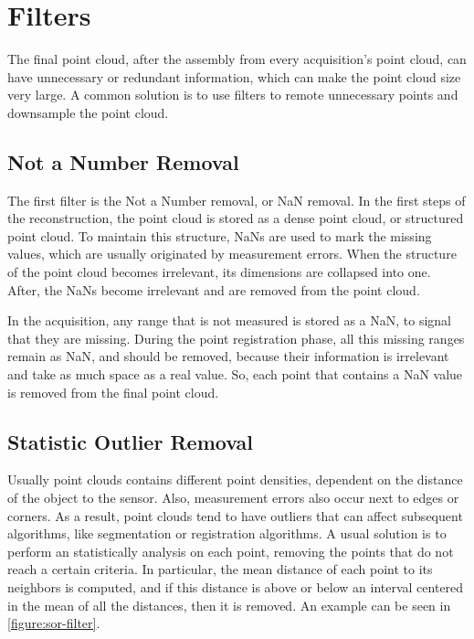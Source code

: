 \section{Filters}
\label{section:filters}

The final point cloud, after the assembly from every acquisition's point cloud, can have unnecessary or redundant information, which can make the point cloud size very large. A common solution is to use filters to remote unnecessary points and downsample the point cloud.

\subsection{Not a Number Removal}

The first filter is the Not a Number removal, or NaN removal. In the first steps of the reconstruction, the point cloud is stored as a dense point cloud, or structured point cloud. To maintain this structure, NaNs are used to mark the missing values, which are usually originated by measurement errors. When the structure of the point cloud becomes irrelevant, its dimensions are collapsed into one. After, the NaNs become irrelevant and are removed from the point cloud.

In the acquisition, any range that is not measured is stored as a NaN, to signal that they are missing. During the point registration phase, all this missing ranges remain as NaN, and should be removed, because their information is irrelevant and take as much space as a real value. So, each point that contains a NaN value is removed from the final point cloud.

\subsection{Statistic Outlier Removal}

Usually point clouds contains different point densities, dependent on the distance of the object to the sensor. Also, measurement errors also occur next to edges or corners. As a result, point clouds tend to have outliers that can affect subsequent algorithms, like segmentation or registration algorithms. A usual solution is to perform an statistically analysis on each point, removing the points that do not reach a certain criteria. In particular, the mean distance of each point to its neighbors is computed, and if this distance is above or below an interval centered in the mean of all the distances, then it is removed. An example can be seen in \cref{figure:sor-filter}.

